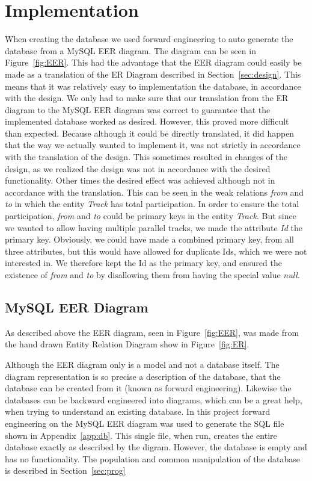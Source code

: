 \section{Implementation} \label{sec:implementation}

When creating the database we used forward engineering to auto generate the 
database from a MySQL EER diagram. The diagram can be seen in 
Figure~\ref{fig:EER}. This had the advantage that the EER diagram could easily 
be made as a translation of the ER Diagram described in 
Section~\ref{sec:design}. This means that it was relatively easy to 
implementation the database, in accordance with the design. We only had to make 
sure that our translation from the ER diagram to the MySQL EER diagram was 
correct to guarantee that the implemented database worked as desired. However, 
this proved more difficult than expected. Because although it could be directly 
translated, it did happen that the way we actually wanted to implement it, was 
not strictly in accordance with the translation of the design. This sometimes 
resulted in changes of the design, as we realized the design was not in 
accordance with the desired functionality. Other times the desired effect was 
achieved although not in accordance with the translation. This can be seen in 
the weak relations \emph{from} and \emph{to} in which the entity \emph{Track} 
has total participation. In order to ensure the total participation, 
\emph{from} and \emph{to} could be primary keys in the entity \emph{Track}. But 
since we wanted to allow having multiple parallel tracks, we made the attribute 
\emph{Id} the primary key. Obviously, we could have made a combined primary 
key, from all three attributes, but this would have allowed for duplicate Ids, 
which we were not interested in. We therefore kept the Id as the primary key, 
and ensured the existence of \emph{from} and \emph{to} by disallowing them from 
having the special value \emph{null}.

\subsection{MySQL EER Diagram}

As described above the EER diagram, seen in Figure~\ref{fig:EER}, was made from 
the hand drawn Entity Relation Diagram show in Figure~\ref{fig:ER}.

Although the EER diagram only is a model and not a database itself. The diagram 
representation is so precise a description of the database, that the database 
can be created from it (known as forward engineering). Likewise the databases 
can be backward engineered into diagrams, which can be a great help, when 
trying to understand an existing database. In this project forward engineering 
on the MySQL EER diagram was used to generate the SQL file shown in 
Appendix~\ref{app:db}. This single file, when run, creates the entire database 
exactly as described by the digram. However, the database is empty and has no 
functionality. The population and common manipulation of the database is 
described in Section~\ref{sec:prog}

